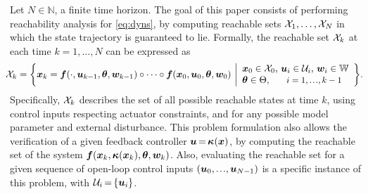 \documentclass{article}
\begin{document}
Let $N\in\mathbb{N}$, a finite time horizon. %
The goal of this paper consists of performing reachability analysis for \eqref{eq:dyns},  by computing reachable sets $\mathcal{X}_1,\dots,\mathcal{X}_N$ in which the state trajectory is guaranteed to lie.  
Formally, the reachable set $\mathcal{X}_k$ at each time $k=1,\dots,N$ can be expressed as
%
%
\begin{align}
\hspace{-2mm}
\X_k = \bigg\{ 
	\x_k = \f(\cdot, \ac_{k-1}, \btheta, \w_{k-1})\circ\dots\circ\f(\x_0, \ac_0, \btheta, \w_0)
\ \bigg| %
\begin{array}{l}
\x_0\in\X_0, \,
\ac_i\in\U_i, \, \w_i\in\W \\
\btheta\in\Theta,
\quad \ \ \mbox{\footnotesize $i=1,\mydots,k-1$} 
\end{array}
\bigg\}
\label{eq:reach_set_onestep}
.
\end{align}
%
%
Specifically, $\mathcal{X}_k$ describes the set of all possible reachable states at time $k$, using control inputs respecting  actuator constraints, and for any possible model parameter and external disturbance. 
This problem formulation also allows the verification of a given feedback controller   $\bm{u}\,{=}\,\boldsymbol\kappa(\bm{x})$, by computing the reachable set of the system $\bm{f}(\bm{x}_k, \boldsymbol\kappa(\bm{x}_k), \bm{\theta}, \bm{w}_k)$. 
Also, evaluating the reachable set for a given sequence of open-loop control inputs %
$(\ac_0,\mydots,\ac_{N{-}1})$ %
is a specific instance of this problem, with $\mathcal{U}_i\,{=}\,\{\bm{u}_i\}$. 
\end{document}
